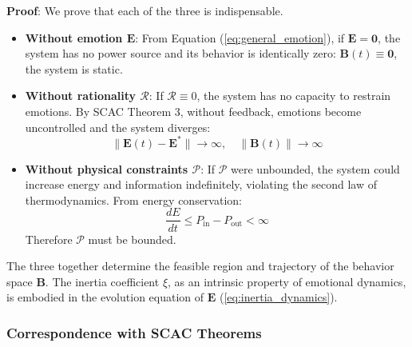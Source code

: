 \documentclass[12pt,a4paper]{article}
\theoremstyle{plain}
\newcommand{\ve}[1]{\bm{#1}}                    %
\newcommand{\Evec}{\ve{E}}                        %
\newcommand{\Bvec}{\ve{B}}                        %
\begin{document}
\textbf{Proof}: We prove that each of the three is indispensable.

\begin{itemize}
    \item \textbf{Without emotion $\Evec$}: From Equation (\ref{eq:general_emotion}), if $\Evec = \mathbf{0}$, the system has no power source and its behavior is identically zero: $\Bvec(t) \equiv \mathbf{0}$, the system is static.
    
    \item \textbf{Without rationality $\mathcal{R}$}: If $\mathcal{R} \equiv 0$, the system has no capacity to restrain emotions. By SCAC Theorem 3, without feedback, emotions become uncontrolled and the system diverges:
    \begin{equation}
    \|\Evec(t) - \Evec^*\| \to \infty, \quad \|\Bvec(t)\| \to \infty
    \end{equation}
    
    \item \textbf{Without physical constraints $\mathcal{P}$}: If $\mathcal{P}$ were unbounded, the system could increase energy and information indefinitely, violating the second law of thermodynamics. From energy conservation:
    \begin{equation}
    \frac{dE}{dt} \leq P_{\text{in}} - P_{\text{out}} < \infty
    \end{equation}
    Therefore $\mathcal{P}$ must be bounded.
\end{itemize}

The three together determine the feasible region and trajectory of the behavior space $\Bvec$. The inertia coefficient $\xi$, as an intrinsic property of emotional dynamics, is embodied in the evolution equation of $\Evec$ (\ref{eq:inertia_dynamics}).

\subsubsection{Correspondence with SCAC Theorems}
\end{document}
